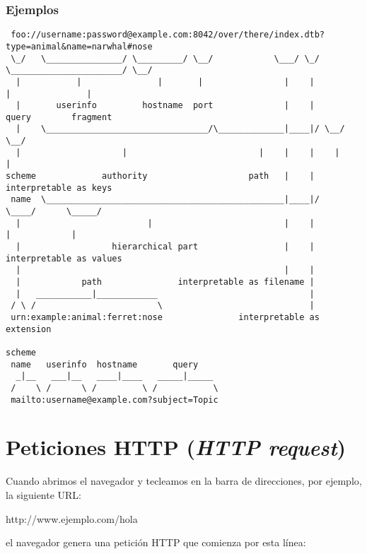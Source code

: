 \documentclass[a4paper,11pt]{memoir}
\begin{document}
\subsubsection{Ejemplos}

\begin{tcolorbox}[float=htb,enhanced,left=2mm,drop fuzzy shadow,adjusted title=Partes de una URL]
\scriptsize
\begin{verbatim}
 foo://username:password@example.com:8042/over/there/index.dtb?type=animal&name=narwhal#nose
 \_/   \_______________/ \_________/ \__/            \___/ \_/ \______________________/ \__/
  |           |               |       |                |    |            |               |
  |       userinfo         hostname  port              |    |          query        fragment
  |    \________________________________/\_____________|____|/ \__/        \__/
  |                    |                          |    |    |    |          |
scheme             authority                    path   |    |    interpretable as keys
 name  \_______________________________________________|____|/      \____/      \_____/
  |                         |                          |    |         |            |
  |                  hierarchical part                 |    |    interpretable as values
  |                                                    |    |
  |            path               interpretable as filename |
  |   ___________|____________                              |
 / \ /                        \                             |
 urn:example:animal:ferret:nose               interpretable as extension

scheme
 name   userinfo  hostname       query
  _|__   ___|__   ____|____   _____|_____
 /    \ /      \ /         \ /           \
 mailto:username@example.com?subject=Topic
\end{verbatim}
\end{tcolorbox}

\section{Peticiones HTTP (\emph{HTTP request})}

Cuando abrimos el navegador y tecleamos en la barra de direcciones,
por ejemplo, la siguiente URL:

\begin{codigo}
http://www.ejemplo.com/hola
\end{codigo}

el navegador genera una petición HTTP que comienza por esta línea:
\end{document}
